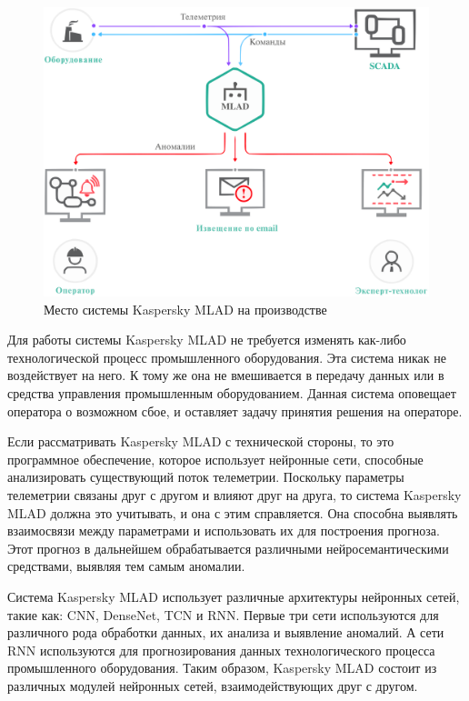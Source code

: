 \begin{figure}[H]
    \centering
    \includegraphics{images/chapter_3/Место_MLAD_на_производстве.png}
    \caption{Место системы Kaspersky MLAD на производстве}
    \label{fig:MLAD}
\end{figure}

Для работы системы Kaspersky MLAD не требуется изменять как-либо технологической процесс промышленного оборудования. Эта система никак не воздействует на него. К тому же она не вмешивается в передачу данных или в средства управления промышленным оборудованием. Данная система оповещает оператора о возможном сбое, и оставляет задачу принятия решения на операторе.

Если рассматривать Kaspersky MLAD с технической стороны, то это программное обеспечение, которое использует нейронные сети, способные анализировать существующий поток телеметрии. Поскольку параметры телеметрии связаны друг с другом и влияют друг на друга, то система Kaspersky MLAD должна это учитывать, и она с этим справляется. Она способна выявлять взаимосвязи между параметрами и использовать их для построения прогноза. Этот прогноз в дальнейшем обрабатывается различными нейросемантическими средствами, выявляя тем самым аномалии.

Система Kaspersky MLAD использует различные архитектуры нейронных сетей, такие как: CNN, DenseNet, TCN и RNN. Первые три сети используются для различного рода обработки данных, их анализа и выявление аномалий. А сети RNN используются для прогнозирования данных технологического процесса промышленного оборудования. Таким образом, Kaspersky MLAD состоит из различных модулей нейронных сетей, взаимодействующих друг с другом.

